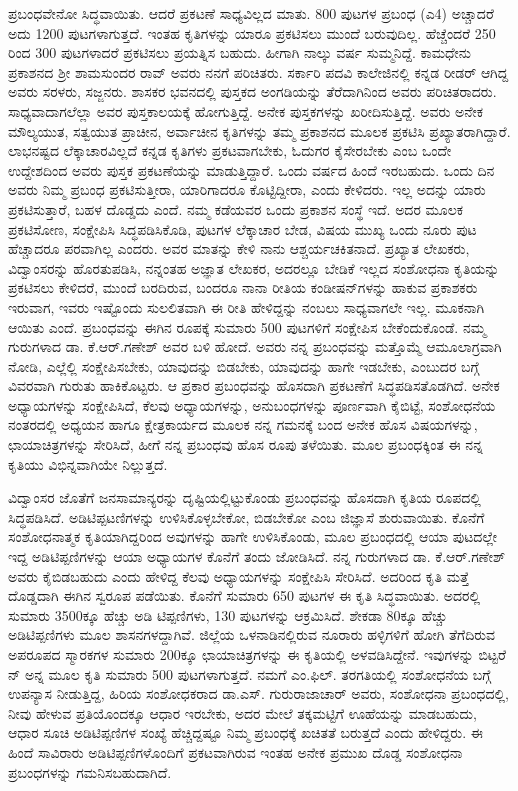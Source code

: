 ಪ್ರಬಂಧವೇನೋ ಸಿದ್ಧವಾಯಿತು. ಆದರೆ ಪ್ರಕಟಣೆ ಸಾಧ್ಯವಿಲ್ಲದ ಮಾತು. 800 ಪುಟಗಳ ಪ್ರಬಂಧ (ಎ4) ಅಚ್ಚಾದರೆ ಅದು 1200 ಪುಟಗಳಾಗುತ್ತದೆ. ಇಂತಹ ಕೃತಿಗಳನ್ನು ಯಾರೂ ಪ್ರಕಟಿಸಲು ಮುಂದೆ ಬರುವುದಿಲ್ಲ. ಹೆಚ್ಚೆಂದರೆ 250 ರಿಂದ 300 ಪುಟಗಳಾದರೆ ಪ್ರಕಟಿಸಲು ಪ್ರಯತ್ನಿಸ ಬಹುದು. ಹೀಗಾಗಿ ನಾಲ್ಕು ವರ್ಷ ಸುಮ್ಮನಿದ್ದೆ. ಕಾಮಧೇನು ಪ್ರಕಾಶನದ ಶ‍್ರೀ ಶಾಮಸುಂದರ ರಾವ್​ ಅವರು ನನಗೆ ಪರಿಚಿತರು. ಸರ್ಕಾರಿ ಪದವಿ ಕಾಲೇಜಿನಲ್ಲಿ ಕನ್ನಡ ರೀಡರ್​ ಆಗಿದ್ದ ಅವರು ಸರಳರು, ಸಜ್ಜನರು. ಶಾಸಕರ ಭವನದಲ್ಲಿ ಪುಸ್ತಕದ ಅಂಗಡಿಯನ್ನು ತೆರೆದಾಗಿನಿಂದ ಅವರು ಪರಿಚಿತರಾದರು. ಸಾಧ್ಯವಾದಾಗಲೆಲ್ಲಾ ಅವರ ಪುಸ್ತಕಾಲಯಕ್ಕೆ ಹೋಗುತ್ತಿದ್ದೆ. ಅನೇಕ ಪುಸ್ತಕಗಳನ್ನು ಖರೀದಿಸುತ್ತಿದ್ದೆ. ಅವರು ಅನೇಕ ಮೌಲ್ಯಯುತ, ಸತ್ವಯುತ ಪ್ರಾಚೀನ, ಅರ್ವಾಚೀನ ಕೃತಿಗಳನ್ನು ತಮ್ಮ ಪ್ರಕಾಶನದ ಮೂಲಕ ಪ್ರಕಟಿಸಿ ಪ್ರಖ್ಯಾತರಾಗಿದ್ದಾರೆ. ಲಾಭನಷ್ಟದ ಲೆಕ್ಕಾಚಾರವಿಲ್ಲದೆ ಕನ್ನಡ ಕೃತಿಗಳು ಪ್ರಕಟವಾಗಬೇಕು, ಓದುಗರ ಕೈಸೇರಬೇಕು ಎಂಬ ಒಂದೇ ಉದ್ದೇಶದಿಂದ ಅವರು ಪುಸ್ತಕ ಪ್ರಕಟಣೆಯನ್ನು ಮಾಡುತ್ತಿದ್ದಾರೆ. ಒಂದು ವರ್ಷದ ಹಿಂದೆ ಇರಬಹುದು. ಒಂದು ದಿನ ಅವರು ನಿಮ್ಮ ಪ್ರಬಂಧ ಪ್ರಕಟಿಸುತ್ತೀರಾ, ಯಾರಿಗಾದರೂ ಕೊಟ್ಟಿದ್ದೀರಾ, ಎಂದು ಕೇಳಿದರು. ಇಲ್ಲ ಅದನ್ನು ಯಾರು ಪ್ರಕಟಿಸುತ್ತಾರೆ, ಬಹಳ ದೊಡ್ಡದು ಎಂದೆ. ನಮ್ಮ ಕಡೆಯವರ ಒಂದು ಪ್ರಕಾಶನ ಸಂಸ್ಥೆ ಇದೆ. ಅದರ ಮೂಲಕ ಪ್ರಕಟಿಸೋಣ, ಸಂಕ್ಷೇಪಿಸಿ ಸಿದ್ಧಪಡಿಸಿಕೊಡಿ, ಪುಟಗಳ ಲೆಕ್ಕಾಚಾರ ಬೇಡ, ವಿಷಯ ಮುಖ್ಯ ಒಂದು ನೂರು ಪುಟ ಹೆಚ್ಚಾದರೂ ಪರವಾಗಿಲ್ಲ ಎಂದರು. ಅವರ ಮಾತನ್ನು ಕೇಳಿ ನಾನು ಆಶ್ಚರ್ಯಚಕಿತನಾದೆ. ಪ್ರಖ್ಯಾತ ಲೇಖಕರು, ವಿದ್ವಾಂಸರನ್ನು ಹೊರತುಪಡಿಸಿ, ನನ್ನಂತಹ ಅಜ್ಞಾತ ಲೇಖಕರ, ಅದರಲ್ಲೂ ಬೇಡಿಕೆ ಇಲ್ಲದ ಸಂಶೋಧನಾ ಕೃತಿಯನ್ನು ಪ್ರಕಟಿಸಲು ಕೇಳಿದರೆ, ಮುಂದೆ ಬರದಿರುವ, ಬಂದರೂ ನಾನಾ ರೀತಿಯ ಕಂಡೀಷನ್​ಗಳನ್ನು ಹಾಕುವ ಪ್ರಕಾಶಕರು ಇರುವಾಗ, ಇವರು ಇಷ್ಟೊಂದು ಸುಲಲಿತವಾಗಿ ಈ ರೀತಿ ಹೇಳಿದ್ದನ್ನು ನಂಬಲು ಸಾಧ್ಯವಾಗಲೇ ಇಲ್ಲ. ಮೂಕನಾಗಿ ಆಯಿತು ಎಂದೆ. ಪ್ರಬಂಧವನ್ನು ಈಗಿನ ರೂಪಕ್ಕೆ ಸುಮಾರು 500 ಪುಟಗಳಿಗೆ ಸಂಕ್ಷೇಪಿಸ ಬೇಕೆಂದುಕೊಂಡೆ. ನಮ್ಮ ಗುರುಗಳಾದ ಡಾ. ಕೆ.ಆರ್​.ಗಣೇಶ್​ ಅವರ ಬಳಿ ಹೋದೆ. ಅವರು ನನ್ನ ಪ್ರಬಂಧವನ್ನು ಮತ್ತೊಮ್ಮೆ ಆಮೂಲಾಗ್ರವಾಗಿ ನೋಡಿ, ಎಲ್ಲೆಲ್ಲಿ ಸಂಕ್ಷೇಪಿಸಬೇಕು, ಯಾವುದನ್ನು ಬಿಡಬೇಕು, ಯಾವುದನ್ನು ಹಾಗೇ ಇಡಬೇಕು, ಎಂಬುದರ ಬಗ್ಗೆ ವಿವರವಾಗಿ ಗುರುತು ಹಾಕಿಕೊಟ್ಟರು. ಆ ಪ್ರಕಾರ ಪ್ರಬಂಧವನ್ನು ಹೊಸದಾಗಿ ಪ್ರಕಟಣೆಗೆ ಸಿದ್ಧಪಡಿಸತೊಡಗಿದೆ. ಅನೇಕ ಅಧ್ಯಾಯಗಳನ್ನು ಸಂಕ್ಷೇಪಿಸಿದೆ, ಕೆಲವು ಅಧ್ಯಾಯಗಳನ್ನು, ಅನುಬಂಧಗಳನ್ನು ಪೂರ್ಣವಾಗಿ ಕೈಬಿಟ್ಟೆ, ಸಂಶೋಧನೆಯ ನಂತರದಲ್ಲಿ ಅಧ್ಯಯನ ಹಾಗೂ ಕ್ಷೇತ್ರಕಾರ್ಯದ ಮೂಲಕ ನನ್ನ ಗಮನಕ್ಕೆ ಬಂದ ಅನೇಕ ಹೊಸ ವಿಷಯಗಳನ್ನು, ಛಾಯಾಚಿತ್ರಗಳನ್ನು ಸೇರಿಸಿದೆ, ಹೀಗೆ ನನ್ನ ಪ್ರಬಂಧವು ಹೊಸ ರೂಪು ತಳೆಯಿತು. ಮೂಲ ಪ್ರಬಂಧಕ್ಕಿಂತ ಈ ನನ್ನ ಕೃತಿಯು ವಿಭಿನ್ನವಾಗಿಯೇ ನಿಲ್ಲುತ್ತದೆ.

ವಿದ್ವಾಂಸರ ಜೊತೆಗೆ ಜನಸಾಮಾನ್ಯರನ್ನು ದೃಷ್ಟಿಯಲ್ಲಿಟ್ಟುಕೊಂಡು ಪ್ರಬಂಧವನ್ನು ಹೊಸದಾಗಿ ಕೃತಿಯ ರೂಪದಲ್ಲಿ ಸಿದ್ಧಪಡಿಸಿದೆ. ಅಡಿಟಿಪ್ಪಟಣಿಗಳನ್ನು ಉಳಿಸಿಕೊಳ್ಳಬೇಕೋ, ಬಿಡಬೇಕೋ ಎಂಬ ಜಿಜ್ಞಾಸೆ ಶುರುವಾಯಿತು. ಕೊನೆಗೆ ಸಂಶೋಧನಾತ್ಮಕ ಕೃತಿಯಾಗಿದ್ದರಿಂದ ಅವುಗಳನ್ನು ಹಾಗೇ ಉಳಿಸಿಕೊಂಡು, ಮೂಲ ಪ್ರಬಂಧದಲ್ಲಿ ಆಯಾ ಪುಟದಲ್ಲೇ ಇದ್ದ ಅಡಿಟಿಪ್ಪಣಿಗಳನ್ನು ಆಯಾ ಅಧ್ಯಾಯಗಳ ಕೊನೆಗೆ ತಂದು ಜೋಡಿಸಿದೆ. ನನ್ನ ಗುರುಗಳಾದ ಡಾ. ಕೆ.ಆರ್​.ಗಣೇಶ್​ ಅವರು ಕೈಬಿಡಬಹುದು ಎಂದು ಹೇಳಿದ್ದ ಕೆಲವು ಅಧ್ಯಾಯಗಳನ್ನು ಸಂಕ್ಷೇಪಿಸಿ ಸೇರಿಸಿದೆ. ಅದರಿಂದ ಕೃತಿ ಮತ್ತೆ ದೊಡ್ಡದಾಗಿ ಈಗಿನ ಸ್ವರೂಪ ಪಡೆಯಿತು. ಕೊನೆಗೆ ಸುಮಾರು 650 ಪುಟಗಳ ಈ ಕೃತಿ ಸಿದ್ಧವಾಯಿತು. ಅದರಲ್ಲಿ ಸುಮಾರು 3500ಕ್ಕೂ ಹೆಚ್ಚು ಅಡಿ ಟಿಪ್ಪಣಿಗಳು, 130 ಪುಟಗಳನ್ನು ಆಕ್ರಮಿಸಿದೆ. ಶೇಕಡಾ 80ಕ್ಕೂ ಹೆಚ್ಚು ಅಡಿಟಿಪ್ಪಣಿಗಳು ಮೂಲ ಶಾಸನಗಳದ್ದಾಗಿವೆ. ಜಿಲ್ಲೆಯ ಒಳನಾಡಿನಲ್ಲಿರುವ ನೂರಾರು ಹಳ್ಳಿಗಳಿಗೆ ಹೋಗಿ ತೆಗೆದಿರುವ ಅಪರೂಪದ ಸ್ಮಾರಕಗಳ ಸುಮಾರು 200ಕ್ಕೂ ಛಾಯಾಚಿತ್ರಗಳನ್ನು ಈ ಕೃತಿಯಲ್ಲಿ ಅಳವಡಿಸಿದ್ದೇನೆ. ಇವುಗಳನ್ನು ಬಿಟ್ಟರೆ ನ್ ಅನ್ನ ಮೂಲ ಕೃತಿ ಸುಮಾರು 500 ಪುಟಗಳಾಗುತ್ತದೆ. ನಮಗೆ ಎಂ.ಫಿಲ್​. ತರಗತಿಯಲ್ಲಿ ಸಂಶೋಧನೆಯ ಬಗ್ಗೆ ಉಪನ್ಯಾಸ ನೀಡುತ್ತಿದ್ದ, ಹಿರಿಯ ಸಂಶೋಧಕರಾದ ಡಾ.ಎಸ್​. ಗುರುರಾಜಾಚಾರ್​ ಅವರು, ಸಂಶೋಧನಾ ಪ್ರಬಂಧದಲ್ಲಿ, ನೀವು ಹೇಳುವ ಪ್ರತಿಯೊಂದಕ್ಕೂ ಆಧಾರ ಇರಬೇಕು, ಅದರ ಮೇಲೆ ತಕ್ಕಮಟ್ಟಿಗೆ ಊಹೆಯನ್ನು ಮಾಡಬಹುದು, ಆಧಾರ ಸೂಚಿ ಅಡಿಟಿಪ್ಪಣಿಗಳ ಸಂಖ್ಯೆ ಹೆಚ್ಚಿದ್ದಷ್ಟೂ ನಿಮ್ಮ ಪ್ರಬಂಧಕ್ಕೆ ಖಚಿತತೆ ಬರುತ್ತದೆ ಎಂದು ಹೇಳಿದ್ದರು. ಈ ಹಿಂದೆ ಸಾವಿರಾರು ಅಡಿಟಿಪ್ಪಣಿಗಳೊಂದಿಗೆ ಪ್ರಕಟವಾಗಿರುವ ಇಂತಹ ಅನೇಕ ಪ್ರಮುಖ ದೊಡ್ಡ ಸಂಶೋಧನಾ ಪ್ರಬಂಧಗಳನ್ನು ಗಮನಿಸಬಹುದಾಗಿದೆ.

